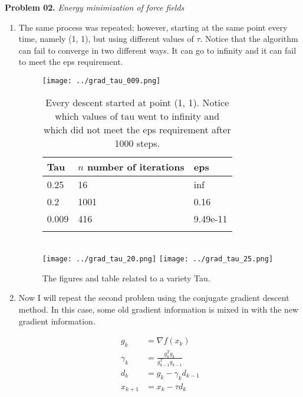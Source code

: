\documentclass{article}
\newcommand{\exnum}{02} %
\newcounter{problem}[section]
\newenvironment{prob}[1]
{
    \refstepcounter{problem}
    \Large{\textbf{Problem \exnum.\theproblem}  \qquad \textit{#1}}
    \begin{enumerate}[label=\alph*]
    \normalsize
}{
    \end{enumerate}
}
\begin{document}
\begin{prob}{Energy minimization of force fields}
\clearpage
\item 

The same process was repeated; however, starting at the same point every time, namely (1, 1), but using different values of $\tau$. Notice that the algorithm can fail to converge in two different ways. It can go to infinity and it can fail to meet the eps requirement.


\begin{figure}
	\centering
	\texttt{[image: ../grad\_tau\_009.png]}\quad%
	\begin{minipage}[b][0.4\textheight][c]{.45\linewidth} 
		\begin{longtable}[]{@{}lll@{}}
			\toprule
			Tau & $n$ number of iterations & eps \tabularnewline
			\midrule
			\endhead
			0.25 & 16 & inf \tabularnewline
			0.2 & 1001 & 0.16 \tabularnewline
			0.009 & 416 & 9.49e-11 \tabularnewline
			\bottomrule
			\caption{Every descent started at point (1, 1). Notice which values of tau went to infinity and which did not meet the eps requirement after 1000 steps.}
			\label{table:prob03}
		\end{longtable}
	\end{minipage}\\[1em]
	\texttt{[image: ../grad\_tau\_20.png]}\quad%
	\texttt{[image: ../grad\_tau\_25.png]}
	\caption{The figures and table related to a variety Tau.}
	\label{fig:problem03}
\end{figure}

\clearpage
\item 

Now I will repeat the second problem using the conjugate gradient descent method. In this case, some old gradient information is mixed in with the new gradient information.

\begin{align}
	g_{k} &= \nabla f(x_{k}) \\
	\gamma_{k} &= \frac{g_{k}^{T} g_{k}}{g_{k-1}^{T} g_{k-1}} \\
	d_{k} &= g_{k} - \gamma_{k} d_{k-1} \\
	x_{k+1} &= x_{k} - \tau d_{k}
\end{align}


\end{prob}
\end{document}
